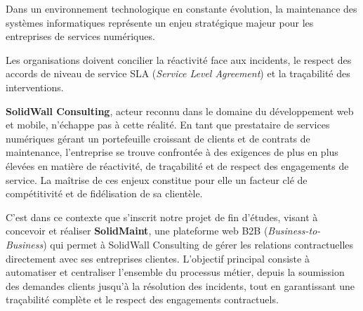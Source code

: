 \thispagestyle{empty}
{}
\mtcaddchapter
{}

\begin{center}
\vspace*{0.2cm}
\vspace{0.3cm}
\end{center}

\justifying
\setlength{\parskip}{4pt plus 1pt}
Dans un environnement technologique en constante évolution, la maintenance des systèmes informatiques représente un enjeu stratégique majeur pour les entreprises de services numériques.
\newline

Les organisations doivent concilier la réactivité face aux incidents, le respect des accords de niveau de service SLA (\textit{Service Level Agreement}) et la traçabilité des interventions.
\newline

\textbf{SolidWall Consulting}, acteur reconnu dans le domaine du développement web et mobile, n'échappe pas à cette réalité. En tant que prestataire de services numériques gérant un portefeuille croissant de clients et de contrats de maintenance, l'entreprise se trouve confrontée à des exigences de plus en plus élevées en matière de réactivité, de traçabilité et de respect des engagements de service. La maîtrise de ces enjeux constitue pour elle un facteur clé de compétitivité et de fidélisation de sa clientèle.
\newline

C’est dans ce contexte que s’inscrit notre projet de fin d’études, visant à concevoir et réaliser \textbf{SolidMaint}, une plateforme web B2B (\textit{Business-to-Business}) qui permet à SolidWall Consulting de gérer les relations contractuelles directement avec ses entreprises clientes. L’objectif principal consiste à automatiser et centraliser l’ensemble du processus métier, depuis la soumission des demandes clients jusqu’à la résolution des incidents, tout en garantissant une traçabilité complète et le respect des engagements contractuels.
\newline

